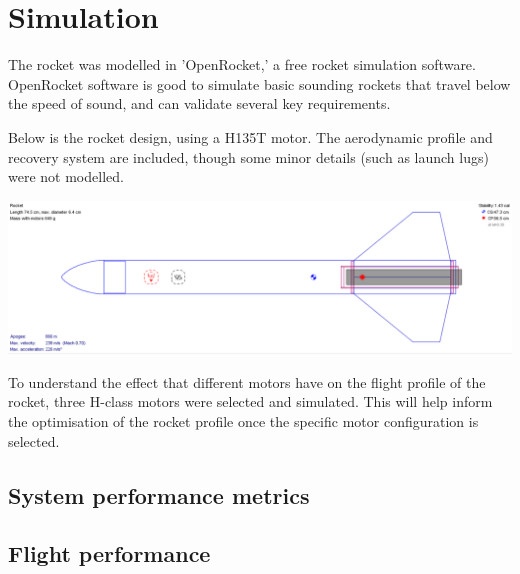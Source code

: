 \documentclass{article}
\begin{document}
\section{Simulation}


The rocket was modelled in 'OpenRocket,' 
a free rocket simulation software. 
OpenRocket software is good to simulate basic sounding rockets that travel below the speed of sound, 
and can validate several key requirements.


Below is the rocket design, using a H135T motor. 
The aerodynamic profile and recovery system are included, 
though some minor details (such as launch lugs) were not modelled.

\includegraphics[width=\textwidth]{rocket model 7-5-23.png}

To understand the effect that different motors have on the flight profile of the rocket, 
three H-class motors were selected and simulated. 
This will help inform the optimisation of the rocket profile once the specific motor configuration is selected.


\subsection{System performance metrics}


\subsection{Flight performance}

\end{document}
